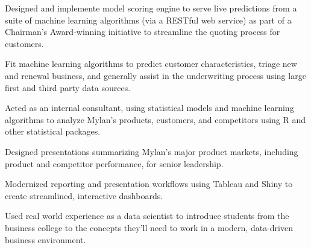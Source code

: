\documentclass[letterpaper]{deedy-resume} %
\begin{document}
\begin{minipage}[t]{0.9\textwidth}
  \hfill
  \begin{tightitemize}  
  \item Designed and implemente model
    scoring engine to serve live predictions from a suite of machine
    learning algorithms (via a RESTful web service) as part of a Chairman's Award-winning
    initiative to streamline the quoting process for customers.
  \item Fit machine learning algorithms to predict customer characteristics, triage new and
  renewal business, and generally assist in the underwriting process using
    large first and third party data sources.
  \end{tightitemize}
  \sectionspace
  
  \hfill{}
  \hfill{}
  \begin{tightitemize}
  \item Acted as an internal consultant, using statistical models and machine
    learning algorithms to 
    analyze Mylan's products, customers, and competitors using R and
    other statistical packages.
  \item Designed presentations summarizing Mylan's major product markets,
    including product and competitor performance, for senior leadership.
  \item Modernized reporting and presentation workflows using Tableau and
    Shiny to create streamlined, interactive dashboards.
  \end{tightitemize}
  \sectionspace %


  \hfill{}
  \hfill
  \begin{tightitemize}
  \item Used real world experience as a data scientist to introduce
    students from the business college to the concepts they'll need to
    work in a modern, data-driven  business environment.
  \end{tightitemize}
  \sectionspace %


\end{minipage}
\end{document}

